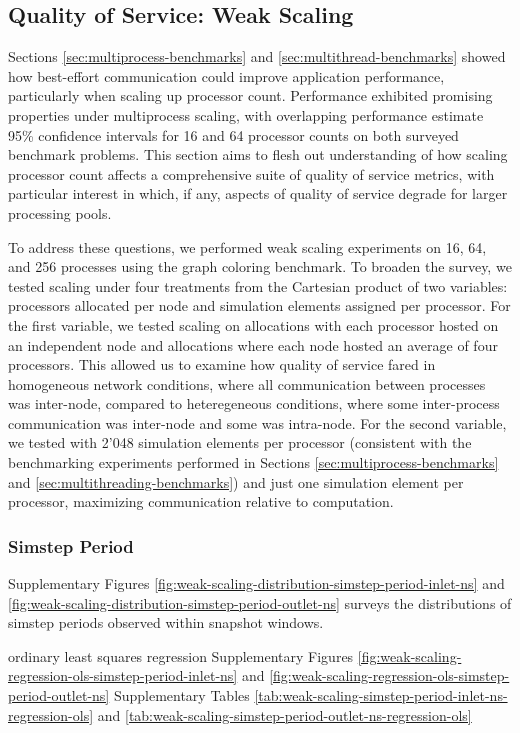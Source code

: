 \subsection{Quality of Service: Weak Scaling}

Sections \ref{sec:multiprocess-benchmarks} and \ref{sec:multithread-benchmarks} showed how best-effort communication could improve application performance, particularly when scaling up processor count.
Performance exhibited promising properties under multiprocess scaling, with overlapping performance estimate 95\% confidence intervals for 16 and 64 processor counts on both surveyed benchmark problems.
This section aims to flesh out understanding of how scaling processor count affects a comprehensive suite of quality of service metrics, with particular interest in which, if any, aspects of quality of service degrade for larger processing pools.

To address these questions, we performed weak scaling experiments on 16, 64, and 256 processes using the graph coloring benchmark.
To broaden the survey, we tested scaling under four treatments from the Cartesian product of two variables: processors allocated per node and simulation elements assigned per processor.
For the first variable, we tested scaling on allocations with each processor hosted on an independent node and allocations where each node hosted an average of four processors.
This allowed us to examine how quality of service fared in homogeneous network conditions, where all communication between processes was inter-node, compared to heteregeneous conditions, where some inter-process communication was inter-node and some was intra-node.
For the second variable, we tested with 2'048 simulation elements per processor (consistent with the benchmarking experiments performed in Sections \ref{sec:multiprocess-benchmarks} and \ref{sec:multithreading-benchmarks}) and just one simulation element per processor, maximizing communication relative to computation.

\subsubsection{Simstep Period}

Supplementary Figures \ref{fig:weak-scaling-distribution-simstep-period-inlet-ns} and \ref{fig:weak-scaling-distribution-simstep-period-outlet-ns} surveys the distributions of simstep periods observed within snapshot windows.

ordinary least squares regression Supplementary Figures \ref{fig:weak-scaling-regression-ols-simstep-period-inlet-ns} and \ref{fig:weak-scaling-regression-ols-simstep-period-outlet-ns} Supplementary Tables \ref{tab:weak-scaling-simstep-period-inlet-ns-regression-ols} and \ref{tab:weak-scaling-simstep-period-outlet-ns-regression-ols}

